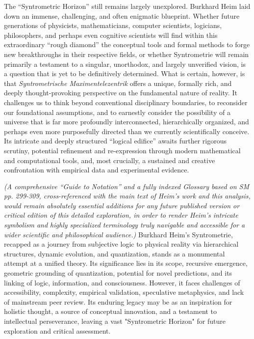 \documentclass[
    12pt,              %
    a4paper,           %
    headings=normal,   %
    twoside=true,      %
    BCOR=8mm,          %
]{scrbook}
\newcommand{\q}[1]{\enquote{#1}}
\begin{document}
The \enquote{Syntrometric Horizon} still remains largely unexplored. Burkhard Heim laid down an immense, challenging, and often enigmatic blueprint. Whether future generations of physicists, mathematicians, computer scientists, logicians, philosophers, and perhaps even cognitive scientists will find within this extraordinary \enquote{rough diamond} the conceptual tools and formal methods to forge new breakthroughs in their respective fields, or whether Syntrometrie will remain primarily a testament to a singular, unorthodox, and largely unverified vision, is a question that is yet to be definitively determined. What is certain, however, is that \textit{Syntrometrische Maximentelezentrik} offers a unique, formally rich, and deeply thought-provoking perspective on the fundamental nature of reality. It challenges us to think beyond conventional disciplinary boundaries, to reconsider our foundational assumptions, and to earnestly consider the possibility of a universe that is far more profoundly interconnected, hierarchically organized, and perhaps even more purposefully directed than we currently scientifically conceive. Its intricate and deeply structured \q{logical edifice} awaits further rigorous scrutiny, potential refinement and re-expression through modern mathematical and computational tools, and, most crucially, a sustained and creative confrontation with empirical data and experimental evidence.

\textit{(A comprehensive \enquote{Guide to Notation} and a fully indexed Glossary based on SM pp. 299-309, cross-referenced with the main text of Heim's work and this analysis, would remain absolutely essential additions for any future published version or critical edition of this detailed exploration, in order to render Heim's intricate symbolism and highly specialized terminology truly navigable and accessible for a wider scientific and philosophical audience.)}
Burkhard Heim's Syntrometrie, recapped as a journey from subjective logic to physical reality via hierarchical structures, dynamic evolution, and quantization, stands as a monumental attempt at a unified theory. Its significance lies in its scope, recursive emergence, geometric grounding of quantization, potential for novel predictions, and its linking of logic, information, and consciousness. However, it faces challenges of accessibility, complexity, empirical validation, speculative metaphysics, and lack of mainstream peer review. Its enduring legacy may be as an inspiration for holistic thought, a source of conceptual innovation, and a testament to intellectual perseverance, leaving a vast "Syntrometric Horizon" for future exploration and critical assessment.
\end{document}

